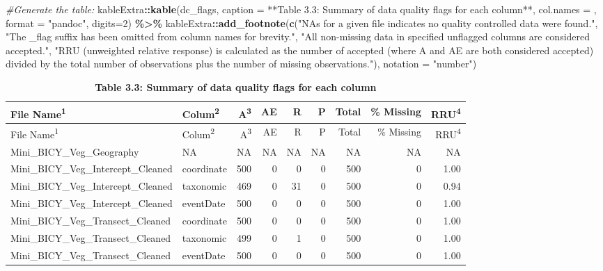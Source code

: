 \documentclass[
]{article}
\newenvironment{Shaded}{\begin{snugshade}}{\end{snugshade}}
\newcommand{\AttributeTok}[1]{\textcolor[rgb]{0.13,0.29,0.53}{#1}}
\newcommand{\CommentTok}[1]{\textcolor[rgb]{0.56,0.35,0.01}{\textit{#1}}}
\newcommand{\DecValTok}[1]{\textcolor[rgb]{0.00,0.00,0.81}{#1}}
\newcommand{\FunctionTok}[1]{\textcolor[rgb]{0.13,0.29,0.53}{\textbf{#1}}}
\newcommand{\NormalTok}[1]{#1}
\newcommand{\SpecialCharTok}[1]{\textcolor[rgb]{0.81,0.36,0.00}{\textbf{#1}}}
\newcommand{\StringTok}[1]{\textcolor[rgb]{0.31,0.60,0.02}{#1}}
\begin{document}
\begin{Shaded}
\begin{Highlighting}[]
\CommentTok{\#Generate the table:}
\NormalTok{kableExtra}\SpecialCharTok{::}\FunctionTok{kable}\NormalTok{(dc\_flags, }\AttributeTok{caption =} \StringTok{\textquotesingle{}**Table 3.3: Summary of data quality flags for each column**\textquotesingle{}}\NormalTok{, }\AttributeTok{col.names =}\NormalTok{ , }\AttributeTok{format =} \StringTok{"pandoc"}\NormalTok{, }\AttributeTok{digits=}\DecValTok{2}\NormalTok{) }\SpecialCharTok{\%\textgreater{}\%}
\NormalTok{kableExtra}\SpecialCharTok{::}\FunctionTok{add\_footnote}\NormalTok{(}\FunctionTok{c}\NormalTok{(}\StringTok{"NAs for a given file indicates no quality controlled data were found."}\NormalTok{,}
               \StringTok{"The \textquotesingle{}\_flag\textquotesingle{} suffix has been omitted from column names for brevity."}\NormalTok{,}
               \StringTok{"All non{-}missing data in specified unflagged columns are considered accepted."}\NormalTok{,}
               \StringTok{"RRU (unweighted relative response) is calculated as the number of accepted (where A and AE are both considered accepted) divided by the total number of observations plus the number of missing observations."}\NormalTok{), }\AttributeTok{notation =} \StringTok{"number"}\NormalTok{)}
\end{Highlighting}
\end{Shaded}

\begin{longtable}[]{@{}llrrrrrrr@{}}
\caption{\textbf{Table 3.3: Summary of data quality flags for each
column}}\tabularnewline
\toprule\noalign{}
File Name\textsuperscript{1} & Colum\textsuperscript{2} &
A\textsuperscript{3} & AE & R & P & Total & \% Missing &
RRU\textsuperscript{4} \\
\midrule\noalign{}
\endfirsthead
\toprule\noalign{}
File Name\textsuperscript{1} & Colum\textsuperscript{2} &
A\textsuperscript{3} & AE & R & P & Total & \% Missing &
RRU\textsuperscript{4} \\
\midrule\noalign{}
\endhead
\bottomrule\noalign{}
\endlastfoot
Mini\_BICY\_Veg\_Geography & NA & NA & NA & NA & NA & NA & NA & NA \\
Mini\_BICY\_Veg\_Intercept\_Cleaned & coordinate & 500 & 0 & 0 & 0 & 500
& 0 & 1.00 \\
Mini\_BICY\_Veg\_Intercept\_Cleaned & taxonomic & 469 & 0 & 31 & 0 & 500
& 0 & 0.94 \\
Mini\_BICY\_Veg\_Intercept\_Cleaned & eventDate & 500 & 0 & 0 & 0 & 500
& 0 & 1.00 \\
Mini\_BICY\_Veg\_Transect\_Cleaned & coordinate & 500 & 0 & 0 & 0 & 500
& 0 & 1.00 \\
Mini\_BICY\_Veg\_Transect\_Cleaned & taxonomic & 499 & 0 & 1 & 0 & 500 &
0 & 1.00 \\
Mini\_BICY\_Veg\_Transect\_Cleaned & eventDate & 500 & 0 & 0 & 0 & 500 &
0 & 1.00 \\
\end{longtable}
\end{document}
